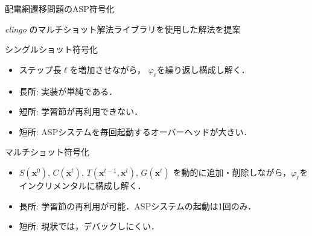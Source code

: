 \documentclass[dvipdfmx,11pt]{beamer}
\begin{document}
\begin{frame}{配電網遷移問題のASP符号化}
\begin{alertblock}{}
 \centering
 \textit{clingo} のマルチショット解法ライブラリを使用した解法を提案
\end{alertblock}
 \vfill
   \begin{block}{シングルショット符号化}
     \begin{itemize}
      \item ステップ長$\ell$を増加させながら，
            $\varphi_{\ell}$を繰り返し構成し解く．
      \item 長所: 実装が単純である．
      \item 短所: 学習節が再利用できない．
      \item 短所: ASPシステムを毎回起動するオーバーヘッドが大きい．
     \end{itemize}
   \end{block}
  \vfill
    \begin{alertblock}{マルチショット符号化}
     \begin{itemize}
      \item $S(\boldsymbol{x}^{0})$, $C(\boldsymbol{x}^{t})$,
            $T(\boldsymbol{x}^{t-1},\boldsymbol{x}^{t})$, $G(\boldsymbol{x}^{t})$
            を動的に追加・削除しながら，$\varphi_{\ell}$をインクリメンタルに構成し解く．
      \item 長所: 学習節の再利用が可能．ASPシステムの起動は1回のみ．
      \item 短所: 現状では，デバックしにくい．
     \end{itemize} 
    \end{alertblock}
\end{frame}
\end{document}

